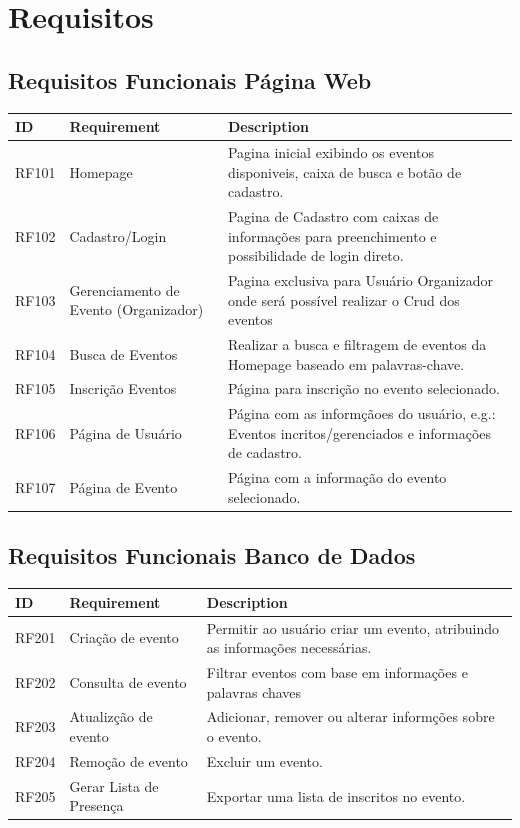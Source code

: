 \chapter{Requisitos}
\label{Requisitos}

\section{Requisitos Funcionais Página Web}

\begin{tabular}{>{\raggedright}p{1.5cm}>{\raggedright}p{4cm}>{\raggedright}p{10cm}}
\toprule
\textbf{ID} & \textbf{Requirement} & \textbf{Description} \tabularnewline 
\midrule
  RF101 & Homepage & Pagina inicial exibindo os eventos disponiveis, caixa de busca e botão de cadastro.\tabularnewline \hline
  RF102 & Cadastro/Login & Pagina de Cadastro com caixas de informações para preenchimento e possibilidade de login direto.\tabularnewline \hline
  RF103 & Gerenciamento de Evento (Organizador) & Pagina exclusiva para Usuário Organizador onde será possível realizar o Crud dos eventos\tabularnewline \hline 
  RF104 & Busca de Eventos & Realizar a busca e filtragem de eventos da Homepage baseado em palavras-chave.\tabularnewline \hline
  RF105 & Inscrição Eventos & Página para inscrição no evento selecionado.\tabularnewline \hline
  RF106 & Página de Usuário & Página com as informçãoes do usuário, e.g.: Eventos incritos/gerenciados e informações de cadastro.\tabularnewline \hline
  RF107 & Página de Evento & Página com a informação do evento selecionado.\tabularnewline
\bottomrule
\end{tabular}

\section{Requisitos Funcionais Banco de Dados}
\begin{tabular}{>{\raggedright}p{1.5cm}>{\raggedright}p{4cm}>{\raggedright}p{10cm}}
\toprule
\textbf{ID} & \textbf{Requirement} & \textbf{Description} \tabularnewline 
\midrule
  RF201 & Criação de evento & Permitir ao usuário criar um evento, atribuindo as informações necessárias.\tabularnewline \hline
  RF202 & Consulta de evento & Filtrar eventos com base em informações e palavras chaves\tabularnewline \hline
  RF203 & Atualizção de evento & Adicionar, remover ou alterar informções sobre o evento.\tabularnewline \hline
  RF204 & Remoção de evento & Excluir um evento.\tabularnewline \hline
  RF205 & Gerar Lista de Presença & Exportar uma lista de inscritos no evento.\tabularnewline 
\bottomrule
\end{tabular}

